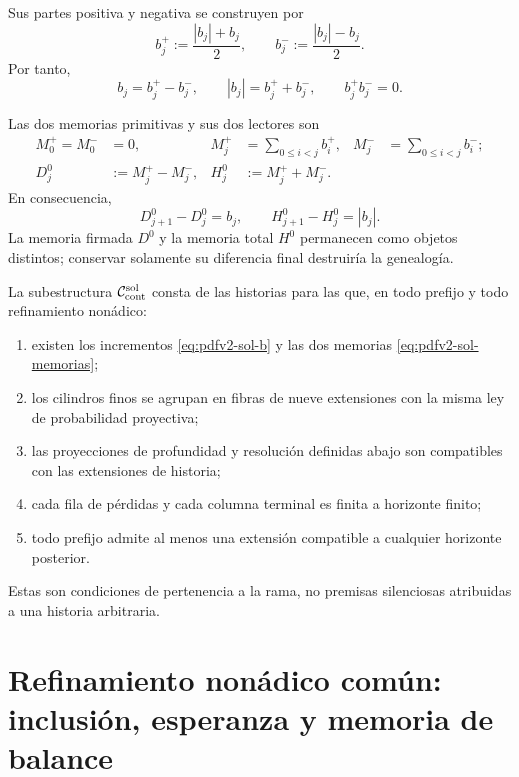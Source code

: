 Sus partes positiva y negativa se construyen por
\begin{equation}\label{eq:pdfv2-sol-bpm}
 b_j^+:=\frac{|b_j|+b_j}{2},
 \qquad
 b_j^-:=\frac{|b_j|-b_j}{2}.
\end{equation}
Por tanto,
\begin{equation}\label{eq:pdfv2-sol-bpm-identidades}
 b_j=b_j^+-b_j^-,
 \qquad
 |b_j|=b_j^++b_j^-,
 \qquad
 b_j^+b_j^-=0.
\end{equation}

Las dos memorias primitivas y sus dos lectores son
\begin{align}
 M_0^+=M_0^-&=0,
 &M_j^+&=\sum_{0\leq i<j}b_i^+,
 &M_j^-&=\sum_{0\leq i<j}b_i^-;
 \label{eq:pdfv2-sol-memorias}\\
 D_j^0&:=M_j^+-M_j^-,
 &H_j^0&:=M_j^++M_j^-.
 \label{eq:pdfv2-sol-dh}
\end{align}
En consecuencia,
\begin{equation}\label{eq:pdfv2-sol-dh-diferencias}
 D_{j+1}^0-D_j^0=b_j,
 \qquad
 H_{j+1}^0-H_j^0=|b_j|.
\end{equation}
La memoria firmada \(D^0\) y la memoria total \(H^0\) permanecen como
objetos distintos; conservar solamente su diferencia final destruiría la
genealogía.

La subestructura \(\mathcal C_{\rm cont}^{\rm sol}\) consta de las historias
para las que, en todo prefijo y todo refinamiento nonádico:
\begin{enumerate}
 \item existen los incrementos \eqref{eq:pdfv2-sol-b} y las dos memorias
       \eqref{eq:pdfv2-sol-memorias};
 \item los cilindros finos se agrupan en fibras de nueve extensiones con la
       misma ley de probabilidad proyectiva;
 \item las proyecciones de profundidad y resolución definidas abajo son
       compatibles con las extensiones de historia;
 \item cada fila de pérdidas y cada columna terminal es finita a horizonte
       finito;
 \item todo prefijo admite al menos una extensión compatible a cualquier
       horizonte posterior.
\end{enumerate}
Estas son condiciones de pertenencia a la rama, no premisas silenciosas
atribuidas a una historia arbitraria.

\fi
\section{Refinamiento nonádico común: inclusión, esperanza y memoria de balance}
\label{sec:pdfv2-sol-e9j9}


